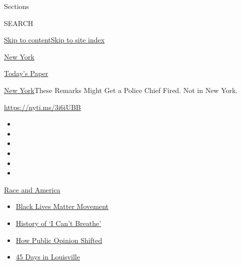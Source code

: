Sections

SEARCH

\protect\hyperlink{site-content}{Skip to
content}\protect\hyperlink{site-index}{Skip to site index}

\href{https://www.nytimes.com/section/nyregion}{New York}

\href{https://myaccount.nytimes.com/auth/login?response_type=cookie\&client_id=vi}{}

\href{https://www.nytimes.com/section/todayspaper}{Today's Paper}

\href{/section/nyregion}{New York}\textbar{}These Remarks Might Get a
Police Chief Fired. Not in New York.

\url{https://nyti.ms/3i6iUBB}

\begin{itemize}
\item
\item
\item
\item
\item
\item
\end{itemize}

\href{https://www.nytimes.com/news-event/george-floyd-protests-minneapolis-new-york-los-angeles?action=click\&pgtype=Article\&state=default\&region=TOP_BANNER\&context=storylines_menu}{Race
and America}

\begin{itemize}
\tightlist
\item
  \href{https://www.nytimes.com/interactive/2020/07/03/us/george-floyd-protests-crowd-size.html?action=click\&pgtype=Article\&state=default\&region=TOP_BANNER\&context=storylines_menu}{Black
  Lives Matter Movement}
\item
  \href{https://www.nytimes.com/interactive/2020/06/28/us/i-cant-breathe-police-arrest.html?action=click\&pgtype=Article\&state=default\&region=TOP_BANNER\&context=storylines_menu}{History
  of `I Can't Breathe'}
\item
  \href{https://www.nytimes.com/interactive/2020/06/10/upshot/black-lives-matter-attitudes.html?action=click\&pgtype=Article\&state=default\&region=TOP_BANNER\&context=storylines_menu}{How
  Public Opinion Shifted}
\item
  \href{https://www.nytimes.com/interactive/2020/07/16/us/black-lives-matter-protests-louisville-breonna-taylor.html?action=click\&pgtype=Article\&state=default\&region=TOP_BANNER\&context=storylines_menu}{45
  Days in Louisville}
\end{itemize}

